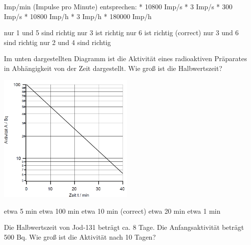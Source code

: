 \documentclass[11pt]{exam}
\begin{document}
\setlength{\voffset}{-0.5in}
\setlength{\headsep}{5pt}

\hspace{2mm}
 \hspace{5mm}
\vspace{4mm}

\begin{questions}

 Imp/min (Impulse pro Minute) entsprechen:	* 10800 Imp/s	* 3 Imp/s	* 300 Imp/s	* 10800 Imp/h	* 3 Imp/h	* 180000 Imp/h

\begin{choices}
	\choice nur 1 und 5 sind richtig
	\choice nur 3 ist richtig
	\choice nur 6 ist richtig (correct)
	\choice nur 3 und 6 sind richtig
	\choice nur 2 und 4 sind richtig
\end{choices}

\vspace{3mm}\question Im unten dargestellten Diagramm ist die Aktivität eines radioaktiven Präparates in Abhängigkeit von der Zeit dargestellt. Wie groß ist die Halbwertszeit? 

\includegraphics[width=0.5\textwidth]{../../../questions/K/images/zerfallsgesetz.png}

\begin{choices}
	\choice etwa 5 min
	\choice etwa 100 min
	\choice etwa 10 min (correct)
	\choice etwa 20 min
	\choice etwa 1 min
\end{choices}

\vspace{3mm}\question Die Halbwertszeit von Jod-131 beträgt ca. 8 Tage. Die Anfangsaktivität beträgt 500 Bq. Wie groß ist die Aktivität nach 10 Tagen?


\end{questions}
\end{document}
